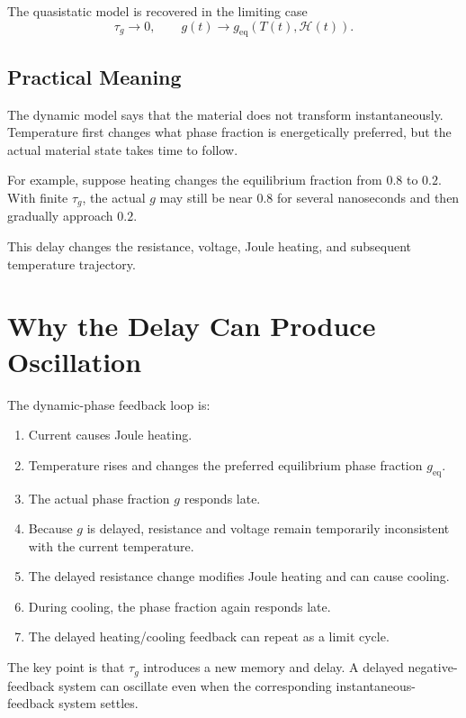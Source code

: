 \documentclass[11pt]{article}
\begin{document}
The quasistatic model is recovered in the limiting case
\begin{equation}
\tau_g \rightarrow 0,
\qquad
g(t)\rightarrow g_{\mathrm{eq}}(T(t),\mathcal{H}(t)).
\end{equation}

\subsection{Practical Meaning}

The dynamic model says that the material does not transform instantaneously. Temperature first changes what phase fraction is energetically preferred, but the actual material state takes time to follow.

For example, suppose heating changes the equilibrium fraction from $0.8$ to $0.2$. With finite $\tau_g$, the actual $g$ may still be near $0.8$ for several nanoseconds and then gradually approach $0.2$.

This delay changes the resistance, voltage, Joule heating, and subsequent temperature trajectory.

\section{Why the Delay Can Produce Oscillation}

The dynamic-phase feedback loop is:
\begin{enumerate}
    \item Current causes Joule heating.
    \item Temperature rises and changes the preferred equilibrium phase fraction $g_{\mathrm{eq}}$.
    \item The actual phase fraction $g$ responds late.
    \item Because $g$ is delayed, resistance and voltage remain temporarily inconsistent with the current temperature.
    \item The delayed resistance change modifies Joule heating and can cause cooling.
    \item During cooling, the phase fraction again responds late.
    \item The delayed heating/cooling feedback can repeat as a limit cycle.
\end{enumerate}

The key point is that $\tau_g$ introduces a new memory and delay. A delayed negative-feedback system can oscillate even when the corresponding instantaneous-feedback system settles.
\end{document}
